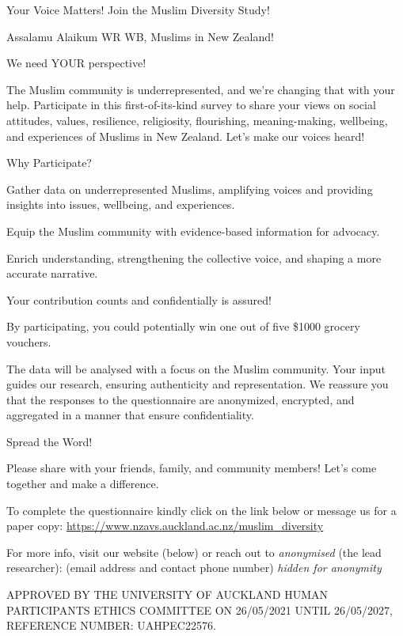 \documentclass[
]{interact}
\begin{document}
Your Voice Matters! Join the Muslim Diversity Study!

\noindent Assalamu Alaikum WR WB, Muslims in New Zealand!

\noindent We need YOUR perspective!

\noindent The Muslim community is underrepresented, and we're changing
that with your help. Participate in this first-of-its-kind survey to
share your views on social attitudes, values, resilience, religiosity,
flourishing, meaning-making, wellbeing, and experiences of Muslims in
New Zealand. Let's make our voices heard!

\noindent Why Participate?

\noindent Gather data on underrepresented Muslims, amplifying voices and
providing insights into issues, wellbeing, and experiences.

\noindent Equip the Muslim community with evidence-based information for
advocacy.

\noindent Enrich understanding, strengthening the collective voice, and
shaping a more accurate narrative.

\noindent Your contribution counts and confidentially is assured!

\noindent By participating, you could potentially win one out of five
\$1000 grocery vouchers.

\noindent The data will be analysed with a focus on the Muslim
community. Your input guides our research, ensuring authenticity and
representation. We reassure you that the responses to the questionnaire
are anonymized, encrypted, and aggregated in a manner that ensure
confidentiality.

\noindent Spread the Word!

\noindent Please share with your friends, family, and community members!
Let's come together and make a difference.

\noindent To complete the questionnaire kindly click on the link below
or message us for a paper copy:
\url{https://www.nzavs.auckland.ac.nz/muslim_diversity}

\noindent For more info, visit our website (below) or reach out to
\emph{anonymised} (the lead researcher): (email address and contact
phone number) \emph{hidden for anonymity}

\noindent APPROVED BY THE UNIVERSITY OF AUCKLAND HUMAN PARTICIPANTS
ETHICS COMMITTEE ON 26/05/2021 UNTIL 26/05/2027, REFERENCE NUMBER:
UAHPEC22576.

\newpage{}
\end{document}
